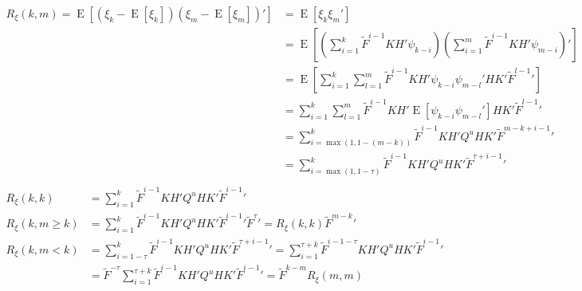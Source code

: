 \documentclass[oneside,12pt]{article}
\begin{document}
\begin{equation}\label{eq:filterOutAutoCov_comp}
    \begin{split}
        R_{\xi}(k,m) = \operatorname{E}[(\xi_k - \operatorname{E}[\xi_k]) (\xi_m - \operatorname{E}[\xi_m])'] &= \operatorname{E}[\xi_k \xi_m']\\
        &= \operatorname{E}[(\sum_{i=1}^{k} \tilde{F}^{i-1} K H' \psi_{k-i}) (\sum_{i=1}^{m} \tilde{F}^{i-1} K H' \psi_{m-i})']\\
        &=\operatorname{E}[\sum_{i=1}^{k} \sum_{l=1}^{m} \tilde{F}^{i-1} K H' \psi_{k-i}  \psi_{m-l}' H K' \tilde{F}^{l-1}']\\
        &=\sum_{i=1}^{k} \sum_{l=1}^{m} \tilde{F}^{i-1} K H' \operatorname{E}[  \psi_{k-i}  \psi_{m-l}' ] H K' \tilde{F}^{l-1}'\\
        &=\sum_{i=\operatorname{max}(1, 1-(m-k))}^{k} \tilde{F}^{i-1} K H' Q^u H K' \tilde{F}^{m-k+i-1}'\\
        &= \sum_{i=\operatorname{max}(1, 1-\tau)}^{k} \tilde{F}^{i-1} K H' Q^u H K' \tilde{F}^{\tau + i-1}'\\
    \end{split}
\end{equation}
%
%
\begin{equation}\label{eq:filterOutAutoCovNotethat_comp}
    \begin{split}
        R_{\xi}(k,k) &= \sum_{i=1}^{k} \tilde{F}^{i-1} K H' Q^u H K' \tilde{F}^{i-1}'\\
        R_{\xi}(k,m \geq k) &= \sum_{i=1}^{k} \tilde{F}^{i-1} K H' Q^u H K' \tilde{F}^{i-1}' \tilde{F}^{\tau}' = R_{\xi}(k,k) \tilde{F}^{m-k}'\\
        R_{\xi}(k,m<k) &= \sum_{i=1-\tau}^{k} \tilde{F}^{i-1} K H' Q^u H K' \tilde{F}^{\tau + i-1}' = \sum_{i=1}^{\tau+k} \tilde{F}^{i-1-\tau} K H' Q^u H K' \tilde{F}^{i-1}'\\
        &= \tilde{F}^{-\tau} \sum_{i=1}^{\tau+k} \tilde{F}^{i-1} K H' Q^u H K' \tilde{F}^{i-1}' = \tilde{F}^{k-m} R_{\xi}(m,m)\\
    \end{split}
\end{equation}
%
%
\end{document}
